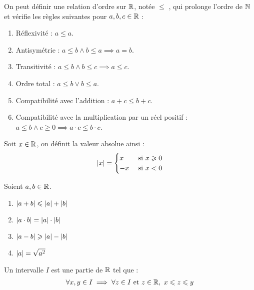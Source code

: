 \begin{proposition}
    On peut définir une relation d'ordre sur $\mathbb{R}$, notée \og $\leq$ \fg, qui prolonge l'ordre de $\mathbb{N}$ et vérifie les règles suivantes pour $a, b, c \in \mathbb{R}$ :
    \begin{enumerate}
        \item Réflexivité : $a \leq a$.
        \item Antisymétrie : $a \leq b \land b \leq a \implies a = b$.
        \item Transitivité : $a \leq b \land b \leq c \implies a \leq c$.
        \item Ordre total : $a \leq b \lor b \leq a$.
        \item Compatibilité avec l'addition : $a + c \leq b + c$.
        \item Compatibilité avec la multiplication par un réel positif : $a \leq b \land c \geq 0 \implies a \cdot c \leq b \cdot c$.
    \end{enumerate}
\end{proposition}

\begin{definition}
    Soit $x \in \mathbb{R}$, on définit la valeur absolue ainsi :
    \begin{align*}
        \abs{x} =
        \begin{cases}
            x &\text{ si } x \geqslant 0 \\
            -x &\text{ si } x < 0
        \end{cases}
    \end{align*}
\end{definition}

\begin{proposition}
   	Soient $a, b \in \mathbb{R}$.
    \begin{enumerate}
            \item $\abs{a + b} \leqslant \abs{a} + \abs{b}$
            \item $\abs{a \cdot b} = \abs{a} \cdot \abs{b}$
            \item $\abs{a - b} \geqslant \abs{a} - \abs{b}$
            \item $\abs{a} = \sqrt{a^2}$
        \end{enumerate}
\end{proposition}

\begin{definition}[Intervalle]
    Un intervalle $I$ est une partie de $\mathbb{R}$ tel que :
    \begin{align*}
        \forall x, y \in I \implies \forall z \in I \text{ et } z \in \mathbb{R},\ x \leqslant z \leqslant y
    \end{align*}
\end{definition}

